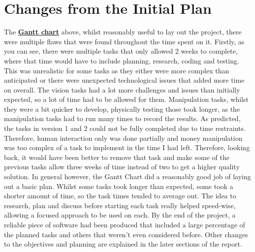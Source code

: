 \section{Changes from the Initial Plan}
The  \hyperref[sec:gantt]{\textbf{Gantt chart}} above, whilst reasonably useful to lay out the project, there were multiple flaws that were found throughout the time spent on it. Firstly, as you can see, there were multiple tasks that only allowed 2 weeks to complete, where that time would have to include planning, research, coding and testing. This was unrealistic for some tasks as they either were more complex than anticipated or there were unexpected technological issues that added more time on overall. 
\newline\newline
The vision tasks had a lot more challenges and issues than initially expected, so a lot of time had to be allowed for them. Manipulation tasks, whilst they were a bit quicker to develop, physically testing those took longer, as the manipulation tasks had to run many times to record the results.
\newline\newline
As predicted, the tasks in version 1 and 2 could not be fully completed due to time restraints. Therefore, human interaction only was done partially and money manipulation was too complex of a task to implement in the time I had left. Therefore, looking back, it would have been better to remove that task and make some of the previous tasks allow three weeks of time instead of two to get a higher quality solution.
\newline\newline
In general however, the Gantt Chart did a reasonably good job of laying out a basic plan. Whilst some tasks took longer than expected, some took a shorter amount of time, so the task times tended to average out. The idea to research, plan and discuss before starting each task really helped speed-wise, allowing a focused approach to be used on each. By the end of the project, a reliable piece of software had been produced that included a large percentage of the planned tasks and others that weren't even considered before. Other changes to the objectives and planning are explained in the later sections of the report.
